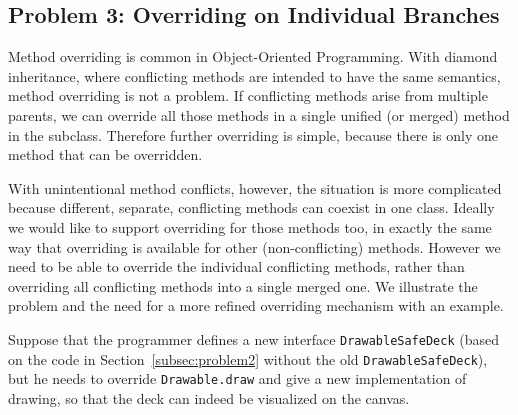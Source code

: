 \subsection{Problem 3: Overriding on Individual Branches}\label{subsec:partialoverrides}
Method overriding is common in Object-Oriented Programming. 
With diamond inheritance, where conflicting methods are intended to have 
the same semantics, method overriding is not a problem. If conflicting
methods arise from multiple parents, we can override all those methods 
in a single unified (or merged) method in the subclass. Therefore
further overriding is simple, because there is only one method that
can be overridden. 

With unintentional method conflicts, however, the situation is more
complicated because different, separate, conflicting methods can coexist
in one class. Ideally we would like to support overriding for those
methods too, in exactly the same way that overriding is available for 
other (non-conflicting) methods. However we need to be able to
override the individual conflicting methods, rather than overriding all
conflicting methods into a single merged one. We illustrate the
problem and the need for a more refined overriding mechanism with 
an example.

Suppose that the programmer defines a new interface \lstinline|DrawableSafeDeck| (based on the code in Section~\ref{subsec:problem2} without the old \lstinline|DrawableSafeDeck|), but he needs to override
\lstinline|Drawable.draw| and give a new implementation of drawing, so that the deck can indeed be visualized on the canvas.


